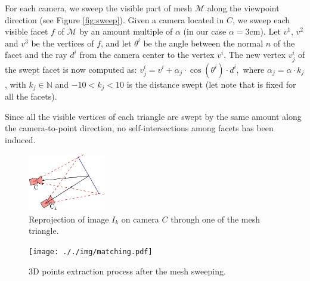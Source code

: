For each camera, we sweep the visible part of mesh $\mathcal{M}$ along the viewpoint direction (see Figure \ref{fig:sweep}). 
Given a camera located in $C$, we sweep each visible facet $f$ of $\mathcal{M}$ by an amount multiple of $\alpha$ (in our case $\alpha = 3$cm).
Let $v^1$, $v^2$ and $v^3$ be the vertices of $f$, and let $\theta^i$ be the angle between the normal $n$ of the facet and the ray $d^i$ from the camera center to the vertex $v^i$. 
The new vertex $v_j^i$ of the swept facet is now computed as:
$
v_j^i = v^i + \alpha_j \cdot \cos (\theta^i) \cdot d^i,
$
where $\alpha_j = \alpha \cdot k_j$, with $k_j \in \mathbb{N}$ and $-10< k_j <10$ is the distance swept (let note that is fixed for all the facets).

Since all the visible vertices of each triangle are swept by the same amount along the camera-to-point direction, no self-intersections among facets has been induced. 



\begin{figure}[t]
\centering
\includegraphics[width=0.3\textwidth]{./img/sweepSteps-01}
\caption{Reprojection of image $I_k$ on camera $C$ through one of the mesh triangle.}
\label{fig:stereo}
\end{figure}

\begin{figure}[t]
  \centering
  \texttt{[image: ././img/matching.pdf]}
\caption{3D points extraction process after the mesh sweeping.}
  \label{fig:matching}
\end{figure}

